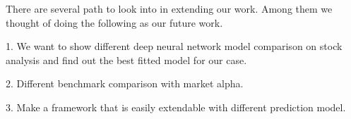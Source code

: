 
There are several path to look into in extending our work. Among them we thought of doing the following as our future work. 

1. We want to show different deep neural network model comparison on stock analysis and find out the best fitted model for our case. 

2. Different benchmark comparison with market alpha. 

3. Make a framework that is easily extendable with different prediction model. 